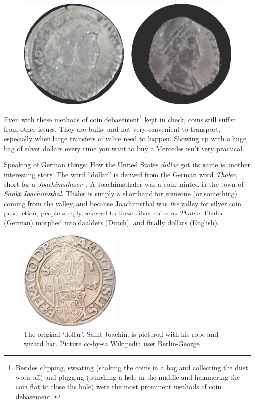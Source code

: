 \begin{figure}
  \includegraphics{assets/images/clipped-coins.png}
  \label{fig:clipped-coins}
\end{figure}

Even with these methods of coin debasement\footnote{Besides clipping, sweating
(shaking the coins in a bag and collecting the dust worn off) and plugging
(punching a hole in the middle and hammering the coin flat to close the hole)
were the most prominent methods of coin debasement. \cite{wiki:coin-debasement}}
kept in check, coins still suffer from other issues. They are bulky and not very
convenient to transport, especially when large transfers of value need to
happen. Showing up with a huge bag of silver dollars every time you want to buy
a Mercedes isn't very practical.

Speaking of German things: How the United States \textit{dollar} got its name is
another interesting story. The word \enquote{dollar} is derived from the German word
\textit{Thaler}, short for a \textit{Joachimsthaler}~\cite{wiki:thaler}. A
Joachimsthaler was a coin minted in the town of \textit{Sankt Joachimsthal}.
Thaler is simply a shorthand for someone (or something) coming from the valley,
and because Joachimsthal was \textit{the} valley for silver coin production,
people simply referred to these silver coins as \textit{Thaler.} Thaler (German)
morphed into daalders (Dutch), and finally dollars (English).

\begin{figure}
  \centering
  \includegraphics[width=5cm]{assets/images/joachimsthaler.png}
  \caption{The original `dollar'. Saint Joachim is pictured with his robe and wizard hat. Picture cc-by-sa Wikipedia user Berlin-George}
  \label{fig:joachimsthaler}
\end{figure}

